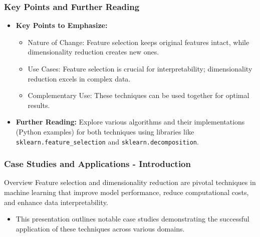 \documentclass{beamer}
\begin{document}
\begin{frame}[fragile]
    \frametitle{Key Points and Further Reading}
    \begin{itemize}
        \item \textbf{Key Points to Emphasize:}
            \begin{itemize}
                \item Nature of Change: Feature selection keeps original features intact, while dimensionality reduction creates new ones.
                \item Use Cases: Feature selection is crucial for interpretability; dimensionality reduction excels in complex data.
                \item Complementary Use: These techniques can be used together for optimal results.
            \end{itemize}
        \item \textbf{Further Reading:} Explore various algorithms and their implementations (Python examples) for both techniques using libraries like \texttt{sklearn.feature_selection} and \texttt{sklearn.decomposition}.
    \end{itemize}
\end{frame}

\begin{frame}[fragile]
    \frametitle{Case Studies and Applications - Introduction}
    
    \begin{block}{Overview}
        Feature selection and dimensionality reduction are pivotal techniques in machine learning that improve model performance, reduce computational costs, and enhance data interpretability. 
    \end{block}
    
    \begin{itemize}
        \item This presentation outlines notable case studies demonstrating the successful application of these techniques across various domains.
    \end{itemize}
\end{frame}
\end{document}

